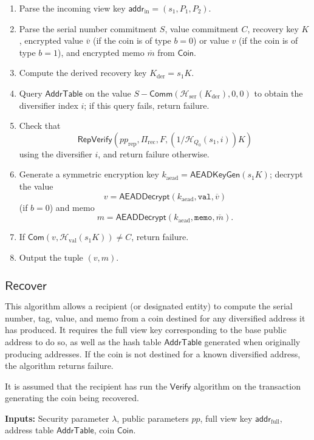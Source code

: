 \documentclass{llncs}
\newcommand{\hash}{\mathcal{H}}
\newcommand{\func}[1]{\mathsf{#1}}
\newcommand{\addr}{\func{addr}}
\newcommand{\com}{\func{Com}}
\newcommand{\comm}{\func{Comm}}
\begin{document}
\begin{enumerate}
\item Parse the incoming view key $\addr_{\text{in}} = (s_1, P_1, P_2)$.
\item Parse the serial number commitment $S$, value commitment $C$, recovery key $K$, encrypted value $\overline{v}$ (if the coin is of type $b=0$) or value $v$ (if the coin is of type $b=1$), and encrypted memo $\overline{m}$ from $\func{Coin}$.
\item Compute the derived recovery key $K_{\text{der}} = s_1 K$.
\item Query $\func{AddrTable}$ on the value $S - \comm(\hash_{\text{ser}}(K_{\text{der}}),0,0)$ to obtain the diversifier index $i$; if this query fails, return failure.
\item Check that $$\func{RepVerify}(pp_{\text{rep}},\Pi_{\text{rec}},F,(1/\hash_{Q_0}(s_1,i))K)$$ using the diversifier $i$, and return failure otherwise.
\item Generate a symmetric encryption key $k_{\text{aead}} = \func{AEADKeyGen}(s_1 K)$; decrypt the value $$v = \func{AEADDecrypt}(k_{\text{aead}},\texttt{val},\overline{v})$$ (if $b=0$) and memo $$m = \func{AEADDecrypt}(k_{\text{aead}},\texttt{memo},\overline{m}).$$
\item If $\com(v,\hash_{\text{val}}(s_1 K)) \neq C$, return failure.
\item Output the tuple $(v, m)$.
\end{enumerate}


\subsection{\texorpdfstring{$\func{Recover}$}{Recover}}

This algorithm allows a recipient (or designated entity) to compute the serial number, tag, value, and memo from a coin destined for any diversified address it has produced.
It requires the full view key corresponding to the base public address to do so, as well as the hash table $\func{AddrTable}$ generated when originally producing addresses.
If the coin is not destined for a known diversified address, the algorithm returns failure.

It is assumed that the recipient has run the $\func{Verify}$ algorithm on the transaction generating the coin being recovered.

\textbf{Inputs:} Security parameter $\lambda$, public parameters $pp$, full view key $\addr_{\text{full}}$, address table $\func{AddrTable}$, coin $\func{Coin}$.
\end{document}
